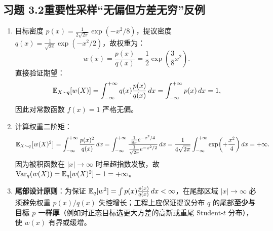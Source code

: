 \subsection*{习题 3.2\quad 重要性采样“无偏但方差无穷”反例}
\begin{enumerate}[label=(\arabic*), leftmargin=1.8em]
  \item 目标密度 $p(x) = \frac{1}{2\sqrt{2\pi}}\exp(-x^2/8)$，提议密度 $q(x) = \frac{1}{\sqrt{2\pi}}\exp(-x^2/2)$，故权重为：
  \[
    w(x) = \frac{p(x)}{q(x)} = \frac{1}{2}\exp\!\left(\frac{3}{8}x^2\right).
  \]
  直接验证期望：
  \[
    \mathbb{E}_{X\sim q}[w(X)] = \int_{-\infty}^{+\infty} q(x)\frac{p(x)}{q(x)}\,dx = \int_{-\infty}^{+\infty} p(x)\,dx = 1,
  \]
  因此对常数函数 $f(x) = 1$ 严格无偏。
  \item 计算权重二阶矩：
  \[
    \mathbb{E}_{X\sim q}\bigl[w(X)^2\bigr]
    = \int_{-\infty}^{+\infty} \frac{p(x)^2}{q(x)}\,dx
    = \int_{-\infty}^{+\infty} \frac{\frac{1}{8\pi}e^{-x^2/4}}{\frac{1}{\sqrt{2\pi}}e^{-x^2/2}}\,dx
    = \frac{1}{4\sqrt{2\pi}} \int_{-\infty}^{+\infty} \exp\!\left(+\frac{x^2}{4}\right)dx = +\infty.
  \]
  因为被积函数在 $|x| \to \infty$ 时呈超指数发散，故 $\operatorname{Var}_q(w(X)) = \mathbb{E}_q[w(X)^2] - 1 = +\infty$。
  \item \textbf{尾部设计原则}：为保证 $\mathbb{E}_q[w^2] = \int p(x)\frac{p(x)}{q(x)}\,dx < \infty$，在尾部区域 $|x|\to\infty$ 必须避免权重 $p(x)/q(x)$ 失控增长；工程上应保证提议分布 $q$ 的尾部\textbf{至少与目标 $p$ 一样厚}（例如对正态目标选更大方差的高斯或重尾 Student-$t$ 分布），使 $w(x)$ 有界或缓增。
\end{enumerate}

